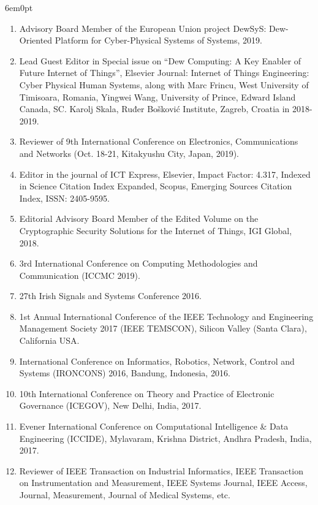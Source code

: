 \documentclass[11pt,a4paper]{moderncv}
\begin{document}
\begin{adjustwidth}{6em}{0pt}
\begin{enumerate}
		\item Advisory Board Member of the European Union project DewSyS: Dew-Oriented Platform for Cyber-Physical Systems of Systems, 2019.
		
		\item Lead Guest Editor in Special issue on “Dew Computing: A Key Enabler of Future Internet of Things”, Elsevier Journal: Internet of Things Engineering: Cyber Physical Human Systems, along with Marc Frincu, West University of Timisoara, Romania, Yingwei Wang, University of Prince, Edward Island Canada, SC. Karolj Skala, Ruđer Bošković Institute, Zagreb, Croatia in 2018-2019.
		
		\item Reviewer of 9th International Conference on Electronics, Communications and Networks (Oct. 18-21, Kitakyushu City, Japan, 2019).
		
		\item Editor in the journal of ICT Express, Elsevier, Impact Factor: 4.317, Indexed in Science Citation Index Expanded, Scopus, Emerging Sources Citation Index, ISSN: 2405-9595.
		
		\item Editorial Advisory Board Member of the Edited Volume on the Cryptographic Security Solutions for the Internet of Things, IGI Global, 2018.
		
		\item 3rd International Conference on Computing Methodologies and Communication (ICCMC 2019).
		
		\item 27th Irish Signals and Systems Conference 2016.
		
		\item 1st Annual International Conference of the IEEE Technology and Engineering Management Society 2017 (IEEE TEMSCON), Silicon Valley (Santa Clara), California USA.
		
		\item International Conference on Informatics, Robotics, Network, Control and Systems (IRONCONS) 2016, Bandung, Indonesia, 2016.
		
		\item 10th International Conference on Theory and Practice of Electronic Governance (ICEGOV), New Delhi, India, 2017.
		
		\item Evener International Conference on Computational Intelligence \& Data Engineering (ICCIDE), Mylavaram, Krishna District, Andhra Pradesh, India, 2017.
		
		\item Reviewer of IEEE Transaction on Industrial Informatics, IEEE Transaction on Instrumentation and Measurement, IEEE Systems Journal, IEEE Access, Journal, Measurement, Journal of Medical Systems, etc.
		
		
	\end{enumerate}
\end{adjustwidth}
\end{document}
